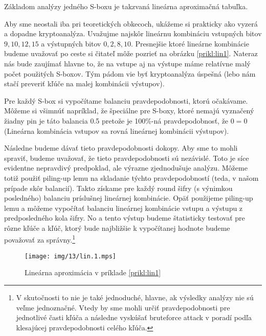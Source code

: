 Základom analýzy jedného S-boxu je takzvaná lineárna aproximačná
tabuľka.





\begin{priklad}
    \label{prikl:lin1}

    Aby sme neostali iba pri teoretických obkecoch, ukážeme si
    prakticky ako vyzerá a dopadne kryptoanalýza. Uvažujme najskôr
    lineárnu kombináciu vstupných bitov $9,10,12,15$ a výstupných
    bitov $0,2,8,10$. Presnejšie ktoré lineárne kombinácie budeme
    uvažovať po ceste si čitateľ môže pozrieť na obrázku
    \ref{prikl:lin1}. Nateraz nás bude zaujímať hlavne to, že na
    vstupe aj na výstupe máme relatívne malý počet použitých S-boxov.
    Tým pádom vie byť kryptoanalýza úspešná (lebo nám stačí preveriť
    kľúče na malej kombinácii výstupov).

    Pre každý S-box si vypočítame balanciu pravdepodobnosti, ktorú
    očakávame. Môžeme si všimnúť napríklad, že špeciálne pre S-boxy,
    ktoré nemajú vyznačený žiadny pin je táto balancia 0.5 pretože je
    100\%-ná pravdepodobnosť, že $0 = 0$ (Lineárna kombinácia vstupov
    sa rovná lineárnej kombinácii výstupov).

    Následne budeme dávať tieto pravdepodobnosti dokopy. Aby sme to
    mohli spraviť, budeme uvažovať, že tieto pravdepodobnosti sú
    nezávislé. Toto je síce evidentne nepravdivý predpoklad, ale
    výrazne zjednodušuje analýzu. Môžeme totiž použiť piling-up lemu
    na skladanie týchto pravdepodobností (teda, v našom prípade skôr
    balancií). Takto získame pre každý round šifry (s výnimkou
    posledného) balanciu príslušnej
    lineárnej kombinácie. Opäť použijeme piling-up lemu a môžeme
    vypočítať balanciu lineárnej kombinácie vstupu a výstupu z
    predposledného kola šifry. No a tento výstup budeme štatisticky
    testovať pre rôzne kľúče a kľúč, ktorý bude najbližšie k
    vypočítanej hodnote budeme považovať za správny.\footnote{V
    skutočnosti to nie je také jednoduché, hlavne, ak výsledky analýzy
    nie sú veľme jednoznačné. Vtedy by sme mohli určiť pravdepodobnosti
    pre jednotlivé časti kľúča a následne vyskúšať bruteforce attack
    v poradí podľa klesajúcej pravdepodobnosti celého kľúča.}

    \begin{figure}[H]
        \centering
        \texttt{[image: img/13/lin.1.mps]}
        \caption{Lineárna aproximácia v príklade \ref{prikl:lin1}}
    \end{figure}



\end{priklad}
